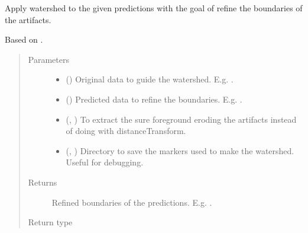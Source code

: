 \documentclass[letterpaper,10pt,english]{sphinxmanual}
\begin{document}
\begin{fulllineitems}
\label{\detokenize{data/post_processing/post_processing:data.post_processing.post_processing.boundary_refinement_watershed}}
Apply watershed to the given predictions with the goal of refine the boundaries of the artifacts.

Based on .
\begin{quote}\begin{description}
\item[{Parameters}] \leavevmode\begin{itemize}
\item {} 
 () \textendash{} Original data to guide the watershed. E.g. .

\item {} 
 () \textendash{} Predicted data to refine the boundaries. E.g. .

\item {} 
 (, ) \textendash{} To extract the sure foreground eroding the artifacts instead of doing with distanceTransform.

\item {} 
 (, ) \textendash{} Directory to save the markers used to make the watershed. Useful for debugging.

\end{itemize}

\item[{Returns}] \leavevmode
{} \textendash{} Refined boundaries of the predictions. E.g. .

\item[{Return type}] \leavevmode
{}


\end{description}
\end{quote}
\end{fulllineitems}
\end{document}
